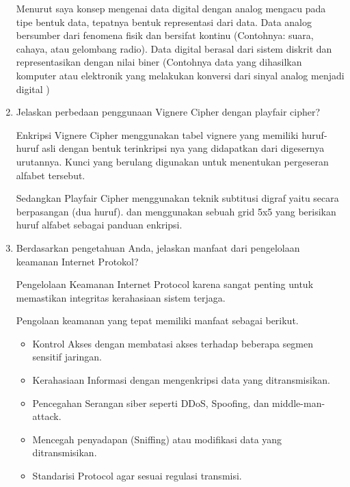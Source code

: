\documentclass[12pt,a4paper]{article}
\begin{document}
\begin{enumerate}
    Menurut saya konsep mengenai data digital dengan analog mengacu pada
    tipe bentuk data, tepatnya bentuk representasi dari data. Data analog 
    bersumber dari fenomena fisik dan bersifat kontinu (Contohnya: suara,
    cahaya, atau gelombang radio). Data digital berasal dari sistem diskrit
    dan representasikan dengan nilai biner (Contohnya data yang dihasilkan
    komputer atau elektronik yang melakukan konversi dari sinyal analog
    menjadi digital )

  \item Jelaskan perbedaan penggunaan Vignere Cipher dengan playfair cipher?

    Enkripsi Vignere Cipher menggunakan tabel vignere yang memiliki
    huruf-huruf asli dengan bentuk terinkripsi nya yang didapatkan dari
    digesernya urutannya. Kunci yang berulang digunakan untuk menentukan
    pergeseran alfabet tersebut.

    Sedangkan Playfair Cipher menggunakan teknik subtitusi digraf yaitu secara 
    berpasangan (dua huruf). dan menggunakan sebuah grid 5x5 yang berisikan
    huruf alfabet sebagai panduan enkripsi.

  \item Berdasarkan pengetahuan Anda, jelaskan manfaat dari pengelolaan keamanan Internet Protokol?


    Pengelolaan Keamanan Internet Protocol karena sangat penting untuk
    memastikan integritas kerahasiaan sistem terjaga.

    Pengolaan keamanan yang tepat memiliki manfaat sebagai berikut.

    \begin{itemize}
      \item Kontrol Akses dengan membatasi akses terhadap beberapa segmen sensitif jaringan.
      \item Kerahasiaan Informasi dengan mengenkripsi data yang ditransmisikan.
      \item Pencegahan Serangan siber seperti DDoS, Spoofing, dan middle-man-attack.
      \item Mencegah penyadapan (Sniffing) atau modifikasi data yang ditransmisikan.
      \item Standarisi Protocol agar sesuai regulasi transmisi.
    \end{itemize}

  
\end{enumerate}
\end{document}
